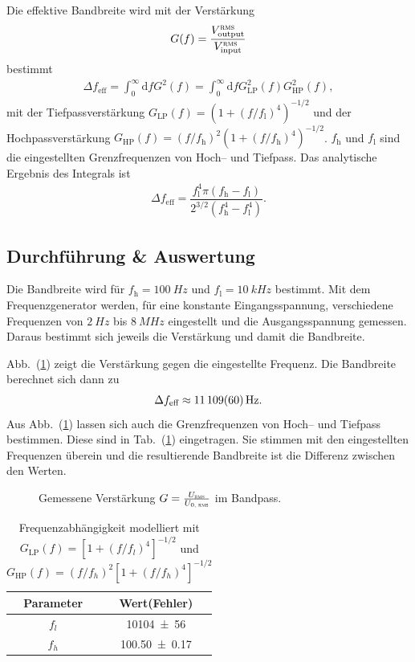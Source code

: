 \documentclass[sn-mathphys-num,iicol]{sn-jnl}
\theoremstyle{thmstyleone}
\theoremstyle{thmstyletwo}
\theoremstyle{thmstylethree}
\newcommand{\td}{\text{d}}
\begin{document}
Die effektive Bandbreite wird mit der Verstärkung
\begin{align}
	G(f)=\dfrac{V^\textsc{rms}_\text{output}}{V^\textsc{rms}_\text{input}}
\end{align}
bestimmt
\begin{align}
	\Delta f_\text{eff}=\int_{0}^{\infty}\td fG^2(f)=\int_{0}^{\infty}\td fG_\text{LP}^2(f)G_\text{HP}^2(f)
	,\end{align}
mit der Tiefpassverstärkung $G_\text{LP}(f)=\left(1+(f/f_\text{l})^4\right)^{-1/2}$ und der Hochpassverstärkung $G_\text{HP}\left(f\right)=\left(f/f_\text{h}\right)^2\left(1+(f/f_\text{h})^4\right)^{-1/2}$.
$f_\text{h}$ und $f_\text{l}$ sind die eingestellten Grenzfrequenzen von Hoch-- und Tiefpass.
Das analytische Ergebnis des Integrals ist
\begin{align}
	\Delta f_\text{eff}=\dfrac{f_\text{l}^4\pi \left(f_\text{h}-f_\text{l}\right)}{2^{3/2}\left(f_\text{h}^4-f_\text{l}^4\right)}
.\end{align}

\subsection{Durchführung \& Auswertung}
Die Bandbreite wird für $f_\text{h}=\SI{100}{Hz}$ und $f_\text{l}=\SI{10}{kHz}$ bestimmt.
Mit dem Frequenzgenerator werden, für eine konstante Eingangsspannung, verschiedene Frequenzen von $\SI{2}{Hz}$ bis $\SI{8}{MHz}$ eingestellt und die Ausgangsspannung gemessen.
Daraus bestimmt sich jeweils die Verstärkung und damit die Bandbreite.

Abb.\ (\ref{fig:bandpass}) zeigt die Verstärkung gegen die eingestellte Frequenz.
Die Bandbreite berechnet sich dann zu
\begin{align}
	\Delta f_\text{eff}\approx \SI{11109+-60}{Hz}
.\end{align}
Aus Abb.\ (\ref{fig:bandpass}) lassen sich auch die Grenzfrequenzen von Hoch-- und Tiefpass bestimmen.
Diese sind in Tab.\ (\ref{tab:bandpass_parameter}) eingetragen.
Sie stimmen mit den eingestellten Frequenzen überein und die resultierende Bandbreite ist die Differenz zwischen den Werten.

\begin{figure}[t]
	\centering
	\resizebox{.5\textwidth}{!}{}
	\caption{Gemessene Verstärkung $G=\frac{U_{\textsc{rms}}}{U_{0\textsc{, rms}}}$ im Bandpass.} \label{fig:bandpass}
\end{figure}
\begin{table}[t]
	\centering
	\begin{tabular}{cc}
		\textbf{Parameter} & {\textbf{Wert(Fehler)}} \\
		\hline
		$f_l$              & \SI{10104 \pm 56}{}     \\
		$f_h$              & \SI{100.50 \pm 0.17}{}  \\
	\end{tabular}
	\label{tab:bandpass_parameter}
	\caption{Frequenzabhängigkeit modelliert mit $G_\text{LP}(f)=\left[1+(f/f_l)^4\right]^{-1/2}$ und $G_\text{HP}(f)=(f/f_h)^2\left[1+(f/f_h)^4\right]^{-1/2}$}
\end{table}
\end{document}

